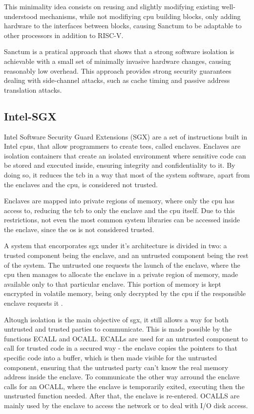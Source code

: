 This minimality idea consists on reusing and slightly modifying existing well-understood mechanisms, while not modifiying \gls{cpu} building blocks, only adding hardware to the interfaces between blocks, causing Sanctum to be adaptable to other processors in addition to RISC-V. 

Sanctum is a pratical approach that shows that a strong software isolation is achievable with a small set of minimally invasive hardware changes, causing reasonably low overhead. 
This approach provides strong security guarantees dealing with side-channel attacks, such as cache timing and passive address translation attacks.

\subsection{Intel-SGX}
\label{ssec:intelsgx}
Intel Software Security Guard Extensions (SGX) are a set of instructions built in Intel \gls{cpu}s, that allow programmers to create \gls{tee}s, called enclaves. Enclaves are isolation containers that create an isolated environment where sensitive code can be stored and executed inside, ensuring integrity and confidentiality to it. By doing so, it reduces the \gls{tcb} in a way that most of the system software, apart from the enclaves and the \gls{cpu}, is considered not trusted.

Enclaves are mapped into private regions of memory, where only the \gls{cpu} has access to, reducing the \gls{tcb} to only the enclave and the \gls{cpu} itself. Due to this restrictions, not even the most common system libraries can be accessed inside the enclave, since the \gls{os} is not considered trusted. 

A system that encorporates \gls{sgx} under it's architecture is divided in two: a trusted component being the enclave, and an untrusted component being the rest of the system. The untrusted one requests the launch of the enclave, where the \gls{cpu} then manages to allocate the enclave in a private region of memory, made available only to that particular enclave. This portion of memory is kept encrypted in volatile memory, being only decrypted by the \gls{cpu} if the responsible enclave requests it \cite{guiBorgesThesis}.

Altough isolation is the main objective of \gls{sgx}, it still allows a way for both  untrusted and trusted parties to communicate. This is made possible by the functions ECALL and OCALL. ECALLs are used for an untrusted component to call for trusted code in a secured way - the enclave copies the pointers to that specific code into a buffer, which is then made visible for the untrusted component, ensuring that the untrusted party can't know the real memory address inside the enclave. To communicate the other way arround the enclave calls for an OCALL, where the enclave is temporarily exited, executing then the unstrusted function needed. After that, the enclave is re-entered. OCALLS are mainly used by the enclave to access the network or to deal with I/O disk access.


